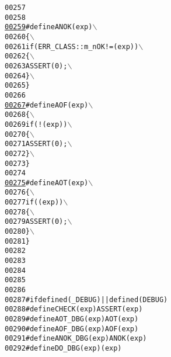 \begin{footnotesize}
\begin{alltt}
00257 \textcolor{preprocessor}{}
00258 
\hypertarget{_macros_8h_source_l00259}{}\hyperlink{_macros_8h_adc67b34d4ece1987358a42609d38fa83}{00259} \textcolor{preprocessor}{#define ANOK( exp )                 \(\backslash\)}
00260 \textcolor{preprocessor}{\{                                   \(\backslash\)}
00261 \textcolor{preprocessor}{        if( ERR\_CLASS::m\_nOK != ( exp ) ) \(\backslash\)}
00262 \textcolor{preprocessor}{\{                                 \(\backslash\)}
00263 \textcolor{preprocessor}{        ASSERT( 0 );                    \(\backslash\)}
00264 \textcolor{preprocessor}{        \}                                 \(\backslash\)}
00265 \textcolor{preprocessor}{        \}}
00266 \textcolor{preprocessor}{}
\hypertarget{_macros_8h_source_l00267}{}\hyperlink{_macros_8h_a36dc8f73d52186445790c61b12f1f745}{00267} \textcolor{preprocessor}{#define AOF( exp )                  \(\backslash\)}
00268 \textcolor{preprocessor}{\{                                   \(\backslash\)}
00269 \textcolor{preprocessor}{        if( !( exp ) )                    \(\backslash\)}
00270 \textcolor{preprocessor}{\{                                 \(\backslash\)}
00271 \textcolor{preprocessor}{        ASSERT( 0 );                    \(\backslash\)}
00272 \textcolor{preprocessor}{        \}                                 \(\backslash\)}
00273 \textcolor{preprocessor}{        \}}
00274 \textcolor{preprocessor}{}
\hypertarget{_macros_8h_source_l00275}{}\hyperlink{_macros_8h_a2d3ffbe0f81b57fe8679aa060b2c3376}{00275} \textcolor{preprocessor}{#define AOT( exp )            \(\backslash\)}
00276 \textcolor{preprocessor}{\{                             \(\backslash\)}
00277 \textcolor{preprocessor}{        if( ( exp ) )               \(\backslash\)}
00278 \textcolor{preprocessor}{\{                           \(\backslash\)}
00279 \textcolor{preprocessor}{        ASSERT( 0 );              \(\backslash\)}
00280 \textcolor{preprocessor}{        \}                           \(\backslash\)}
00281 \textcolor{preprocessor}{        \}}
00282 \textcolor{preprocessor}{}
00283 
00284 
00285 
00286 
00287 \textcolor{preprocessor}{#if defined( \_DEBUG ) || defined( DEBUG )}
00288 \textcolor{preprocessor}{}\textcolor{preprocessor}{#define CHECK( exp )      ASSERT( exp )}
00289 \textcolor{preprocessor}{}\textcolor{preprocessor}{#define AOT\_DBG( exp )    AOT( exp )}
00290 \textcolor{preprocessor}{}\textcolor{preprocessor}{#define AOF\_DBG( exp )    AOF( exp )}
00291 \textcolor{preprocessor}{}\textcolor{preprocessor}{#define ANOK\_DBG( exp )   ANOK( exp )}
00292 \textcolor{preprocessor}{}\textcolor{preprocessor}{#define DO\_DBG( exp )     ( exp )}

\end{alltt}
\end{footnotesize}

